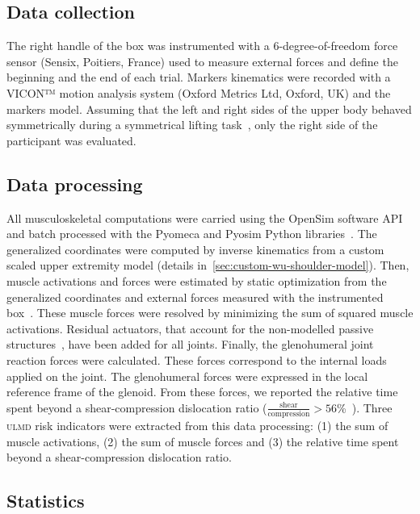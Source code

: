 \subsection{Data collection}\label{subsec:data-collection}

The right handle of the box was instrumented with a 6-degree-of-freedom force sensor (Sensix, Poitiers, France) used to measure external forces and define the beginning and the end of each trial.
Markers kinematics were recorded with a VICON™ motion analysis system (Oxford Metrics Ltd, Oxford, UK) and the \citet{Jackson2012-uj} markers model.
Assuming that the left and right sides of the upper body behaved symmetrically during a symmetrical lifting task~\cite{Bouffard2019-fd, Martinez2019-mm, Nielsen1998-fc}, only the right side of the participant was evaluated.

\subsection{Data processing}\label{subsec:data-processing}

All musculoskeletal computations were carried using the OpenSim software API~\cite{Delp2007-ol} and batch processed with the Pyomeca and Pyosim Python libraries~\cite{martinez-pyo}.
The generalized coordinates were computed by inverse kinematics from a custom scaled \citet{Wu2016-kw} upper extremity model (details in~\ref{sec:custom-wu-shoulder-model}).
Then, muscle activations and forces were estimated by static optimization from the generalized coordinates and external forces measured with the instrumented box~\cite{Anderson2001-ma, Erdemir2007-ou}.
These muscle forces were resolved by minimizing the sum of squared muscle activations.
Residual actuators, that account for the non-modelled passive structures~\cite{Hicks2015-wl}, have been added for all joints.
Finally, the glenohumeral joint reaction forces were calculated.
These forces correspond to the internal loads applied on the joint.
The glenohumeral forces were expressed in the local reference frame of the glenoid.
From these forces, we reported the relative time spent beyond a shear-compression dislocation ratio ($\frac{\textrm{shear}}{\textrm{compression}} > 56$\%~\cite{Dickerson2007-qj}).
Three \textsc{ulmd} risk indicators were extracted from this data processing: (1) the sum of muscle activations, (2) the sum of muscle forces and (3) the relative time spent beyond a shear-compression dislocation ratio.

\subsection{Statistics}\label{subsec:statistics}

